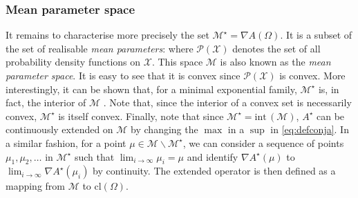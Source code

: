 \subsubsection*{Mean parameter space}
It remains to characterise more precisely the set $\mathcal M^{\star}=\nabla A(\Omega)$. It is a subset of the set of realisable \emph{mean parameters}:
%
%
where $\mathcal P(\mathcal X)$ denotes the set of all probability density functions on $\mathcal X$. This space $\mathcal M$ is also known as the \emph{mean parameter space}. It is easy to see that it is convex since $\mathcal P(\mathcal X)$ is convex. More interestingly, it can be shown that, for a minimal exponential family, $\mathcal M^{\star}$ is, in fact, the interior of $\mathcal M$ \citep[theorem 3.3]{wainwright08}. Note that, since the interior of a convex set is necessarily convex, $\mathcal M^{\star}$ is itself convex. Finally, note that since $\mathcal M^{\star}=\mathrm{int}\,(\mathcal M)$, $A^{\star}$ can be continuously extended on $\mathcal M$ by changing the $\max$ in a $\sup$ in \eqref{eq:defconja}. In a similar fashion, for a point $\mu\in\mathcal M\backslash \mathcal M^{\star}$, we can consider a sequence of points $\mu_{1},\mu_{2},\dots$ in $\mathcal M^{\star}$ such that $\lim_{i\to\infty}\mu_{i}=\mu$ and identify $\nabla A^{\star}(\mu)$ to $\lim_{i\to\infty}\nabla A^{\star}(\mu_{i})$ by continuity. The extended operator is then defined as a mapping from $\mathcal M$ to $\mathrm{cl}(\Omega)$.

%
